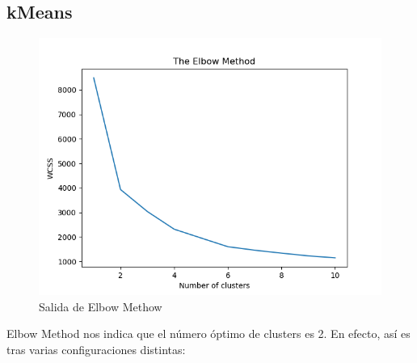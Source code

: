 \subsection{kMeans}

\begin{figure}[H] %
	\centering
	\includegraphics[scale=0.6]{em1.png}  %
	\caption{Salida de Elbow Methow} 
	\label{fig:em-caso1}
\end{figure}

Elbow Method nos indica que el número óptimo de clusters es 2. En efecto, así es tras varias configuraciones distintas:

